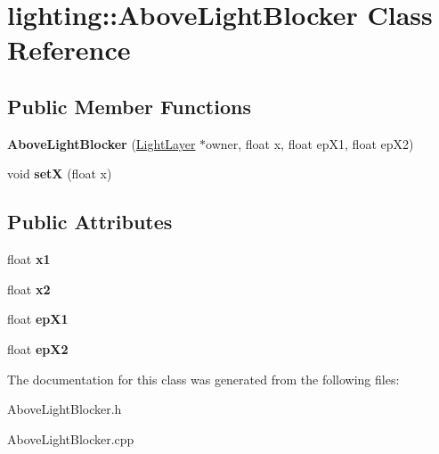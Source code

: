 \hypertarget{classlighting_1_1AboveLightBlocker}{}\section{lighting\+:\+:Above\+Light\+Blocker Class Reference}
\label{classlighting_1_1AboveLightBlocker}
\subsection*{Public Member Functions}
\begin{DoxyCompactItemize}
\item 
{\bfseries Above\+Light\+Blocker} (\hyperlink{classlighting_1_1LightLayer}{Light\+Layer} $\ast$owner, float x, float ep\+X1, float ep\+X2)\hypertarget{classlighting_1_1AboveLightBlocker_af0e842685677faee27b1559342f20bde}{}\label{classlighting_1_1AboveLightBlocker_af0e842685677faee27b1559342f20bde}

\item 
void {\bfseries setX} (float x)\hypertarget{classlighting_1_1AboveLightBlocker_a5a2e591513876a73af1c61948ae270d4}{}\label{classlighting_1_1AboveLightBlocker_a5a2e591513876a73af1c61948ae270d4}

\end{DoxyCompactItemize}
\subsection*{Public Attributes}
\begin{DoxyCompactItemize}
\item 
float {\bfseries x1}\hypertarget{classlighting_1_1AboveLightBlocker_ad985c168b6dee9bea7e4bb15216a44dd}{}\label{classlighting_1_1AboveLightBlocker_ad985c168b6dee9bea7e4bb15216a44dd}

\item 
float {\bfseries x2}\hypertarget{classlighting_1_1AboveLightBlocker_aea8fa8c213d2bda74ce418b4ffce4bc1}{}\label{classlighting_1_1AboveLightBlocker_aea8fa8c213d2bda74ce418b4ffce4bc1}

\item 
float {\bfseries ep\+X1}\hypertarget{classlighting_1_1AboveLightBlocker_a8617c39247272346d42b9b9ebd0fd164}{}\label{classlighting_1_1AboveLightBlocker_a8617c39247272346d42b9b9ebd0fd164}

\item 
float {\bfseries ep\+X2}\hypertarget{classlighting_1_1AboveLightBlocker_a85405da672bd9e71337deb6e8502f542}{}\label{classlighting_1_1AboveLightBlocker_a85405da672bd9e71337deb6e8502f542}

\end{DoxyCompactItemize}


The documentation for this class was generated from the following files\+:\begin{DoxyCompactItemize}
\item 
Above\+Light\+Blocker.\+h\item 
Above\+Light\+Blocker.\+cpp\end{DoxyCompactItemize}
